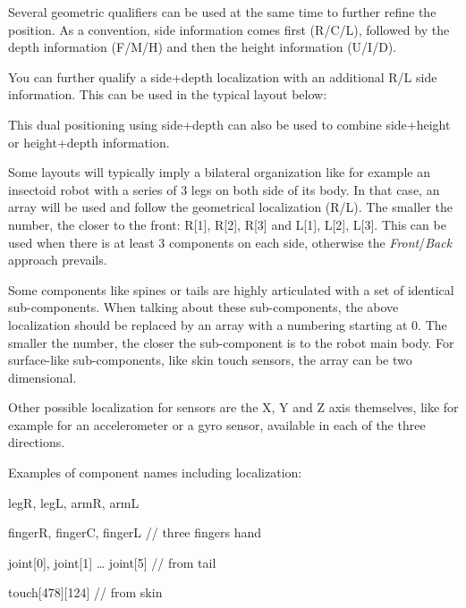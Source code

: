 \documentclass[a4paper]{article}
\begin{document}
{\par}

{
\textsf{Several geometric qualifiers can be used at the same time to
further refine the position. As a convention, side information comes
first (}R\textsf{/}C\textsf{/}L\textsf{), followed by the depth
information (}F\textsf{/}M\textsf{/}H\textsf{) and then the height
information (}U\textsf{/}I\textsf{/}D\textsf{). }}


You can further qualify a side+depth localization with an additional R/L
side information. This can be used in the typical layout below:

{\centering
\par}


This dual positioning using side+depth can also be used to combine
side+height or height+depth information.


Some layouts will typically imply a bilateral organization like for
example an insectoid robot with a series of 3 legs on both side of its
body. In that case, an array will be used and follow the geometrical
localization (R/L). The smaller the number, the closer to the front:
R[1], R[2], R[3] and L[1], L[2], L[3]. This can be used when there is
at least 3 components on each side, otherwise the
\textit{Front}/\textit{Back} approach prevails.


Some components like spines or tails are highly articulated with a set
of identical sub-components. When talking about these sub-components,
the above localization should be replaced by an array with a numbering
starting at 0. The smaller the number, the closer the sub-component is
to the robot main body. For surface-like sub-components, like skin
touch sensors, the array can be two dimensional.


Other possible localization for sensors are the X, Y and Z axis
themselves, like for example for an accelerometer or a gyro sensor,
available in each of the three directions.


Examples of component names including localization:

{
legR, legL, armR, armL}

{
fingerR, fingerC, fingerL // three fingers hand}

{
joint[0], joint[1] … joint[5] // from tail}

{
touch[478][124] // from skin}
\end{document}
